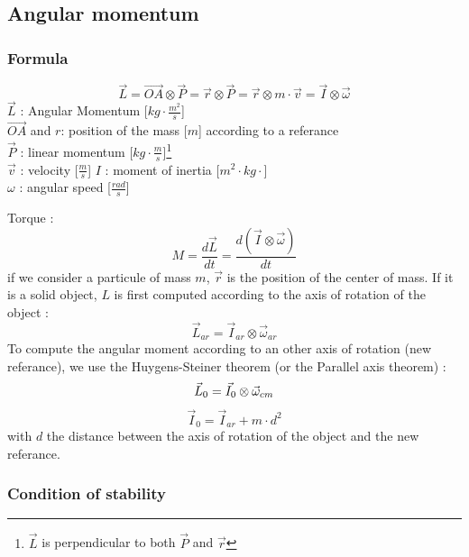 \documentclass[12pt,a4paper]{article}
\begin{document}
\newpage
\subsection{Angular momentum}

\subsubsection{Formula}
\begin{equation}
	\vec{L}=\vec{OA} \otimes \vec{P}=\vec{r} \otimes \vec{P}=\vec{r} \otimes m \cdot \vec{v}=\vec{I} \otimes \vec{\omega}
\end{equation}
$\vec{L}$ : Angular Momentum [$kg \cdot \frac{m^2}{s}$]\\
$\vec{OA}$ and $r$: position of the mass [$m$] according to a referance\\
$\vec{P}$ : linear momentum [$kg\cdot \frac{m}{s}$]\footnote{$\vec{L}$ is perpendicular to both $\vec{P}$ and $\vec{r}$}\\
$\vec{v}$ : velocity [$\frac{m}{s}$]
$I$ : moment of inertia [$m^2 \cdot kg \cdot$]\\
$\omega$ : angular speed [$\frac{rad}{s}$]

Torque : 
\begin{equation}
	M = \frac{d\vec{L}}{dt}=\frac{d(\vec{I} \otimes \vec{\omega})}{dt}
\end{equation}
\medbreak
if we consider a particule of mass $m$, $\vec{r}$ is the position of the center of mass.
If it is a solid object, $L$ is first computed according to the axis of rotation of the object : 
\begin{equation}
	\vec{L}_{ar}=\vec{I}_{ar} \otimes \vec{\omega}_{ar}
\end{equation}
To compute the angular moment according to an other axis of rotation (new referance), we use the Huygens-Steiner theorem (or the Parallel axis theorem) : 
\begin{equation}
	\vec{L}_{0}=\vec{I}_{0} \otimes \vec{\omega}_{cm}\\
\end{equation}
\begin{equation}
	\vec{I}_{0} = \vec{I}_{ar} + m\cdot d^2
\end{equation}
with $d$ the distance between the axis of rotation of the object and the new referance. 
\subsubsection{Condition of stability}
\end{document}

